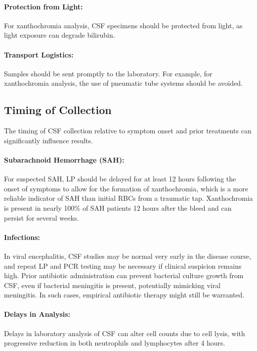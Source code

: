 \paragraph{Protection from Light:} For xanthochromia analysis, CSF specimens should be protected from light, as light exposure can degrade bilirubin.
	
\paragraph{Transport Logistics:} Samples should be sent promptly to the laboratory. For example, for xanthochromia analysis, the use of pneumatic tube systems should be avoided.
	
\subsection{Timing of Collection}
	
	The timing of CSF collection relative to symptom onset and prior treatments can significantly influence results.
	
\paragraph{Subarachnoid Hemorrhage (SAH):} For suspected SAH, LP should be delayed for at least 12 hours following the onset of symptoms to allow for the formation of xanthochromia, which is a more reliable indicator of SAH than initial RBCs from a traumatic tap. Xanthochromia is present in nearly 100\% of SAH patients 12 hours after the bleed and can persist for several weeks.
	
\paragraph{Infections:} In viral encephalitis, CSF studies may be normal very early in the disease course, and repeat LP and PCR testing may be necessary if clinical suspicion remains high. Prior antibiotic administration can prevent bacterial culture growth from CSF, even if bacterial meningitis is present, potentially mimicking viral meningitis. In such cases, empirical antibiotic therapy might still be warranted.
	
\paragraph{Delays in Analysis:} Delays in laboratory analysis of CSF can alter cell counts due to cell lysis, with progressive reduction in both neutrophils and lymphocytes after 4 hours.
	
